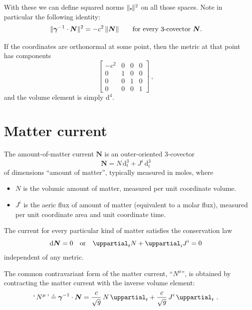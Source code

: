 \documentclass[\ifafour a4paper,12pt,\else a5paper,10pt,\fi%
onecolumn,oneside,article,%
british%
]{memoir}
\theoremstyle{remark}
\theoremstyle{innote}
\newcommand*{\de}{\uppartial}%
\newcommand*{\di}{\mathrm{d}}%
\newcommand*{\corr}{\mathrel{\hat{=}}}%
\renewcommand*{\|}[1][]{\nonscript\:#1\vert\nonscript\:\mathopen{}}
\newcommand*{\se}[1]{\de_{#1}}
\newcommand*{\ttti}[1]{\di^{3}_{#1}}
\newcommand*{\tttti}[1]{\di^{4}_{#1}}
\newcommand*{\dg}{\sqrt{g}}
\DeclarePairedDelimiter\nor{\lVert}{\rVert}
\newcommand*{\vi}{\bm{\gamma}^{-1}}
\newcommand*{\yN}{\bm{N}}
\begin{document}
With these we can define squared norms $\nor{\mathord{\centerdot}}^{2}$ on all those spaces. Note in particular the following identity:
\begin{equation}
  \label{eq:norm_3cov_identity}
  \nor{\vi\cdot\yN}^{2} = -c^{2}\,\nor{\yN}
  \qquad\text{for every 3-covector $\yN$}.
\end{equation}

If the coordinates are orthonormal at some point, then the metric at that point has components
\begin{equation}
  \label{eq:metric_orthonormal}
  \begin{bmatrix}
    -c^{2}&0&0&0\\0&1&0&0\\0&0&1&0\\0&0&0&1
  \end{bmatrix} \ ,
\end{equation}
and the volume element is simply $\tttti{}$.

\section{Matter current}
\label{sec:matter_current}

The amount-of-matter current $\yN$ is an outer-oriented 3-covector
\begin{equation}
  \label{eq:matter_current}
  \yN = N\,\ttti{t} + J^{i}\,\ttti{i}
\end{equation}
of dimensions \enquote{amount of matter}, typically measured in moles, where
\begin{itemize}
\item $N$ is the volumic amount of matter, measured per unit coordinate volume.
\item $J^{i}$ is the aeric flux of amount of matter (equivalent to a molar flux), measured per unit coordinate area and unit coordinate time.
\end{itemize}

The current for every particular kind of matter satisfies the conservation law
\begin{equation}
  \label{eq:cons_matter}
  \di\yN = 0
  \quad\text{or}\quad
  \de_{t}N + \de_{i} J^{i} = 0
\end{equation}
independent of any metric.

\medskip

The common contravariant form of the matter current, \enquote{$N^{\mu}$}, is obtained by contracting the matter current with the inverse volume element:
\begin{equation}
  \label{eq:contrav_matter_current}
  \text{`\,}N^{\mu}\text{\,'} \corr  \vi \cdot \yN =
  \frac{c}{\dg}\, N\, \se{t} + \frac{c}{\dg}\, J^{i}\, \se{t} \ .
\end{equation}
\end{document}
